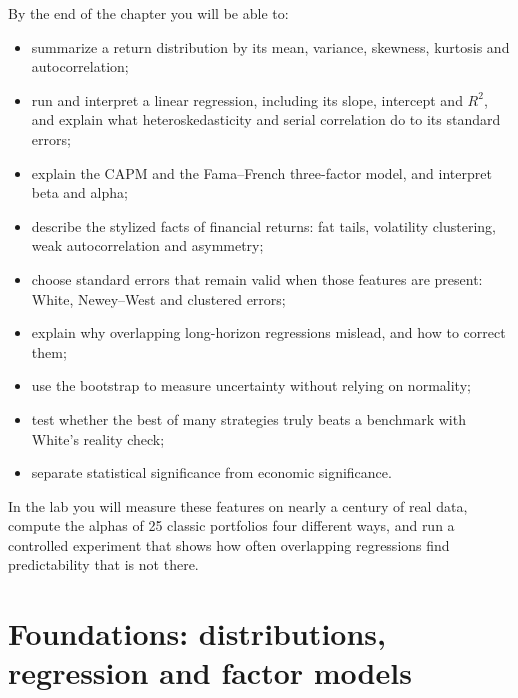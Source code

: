 By the end of the chapter you will be able to:

\begin{itemize}
  \item summarize a return distribution by its mean, variance, skewness, kurtosis and autocorrelation;
  \item run and interpret a linear regression, including its slope, intercept and $R^2$, and explain what heteroskedasticity and serial correlation do to its standard errors;
  \item explain the CAPM and the Fama--French three-factor model, and interpret beta and alpha;
  \item describe the stylized facts of financial returns: fat tails, volatility clustering, weak autocorrelation and asymmetry;
  \item choose standard errors that remain valid when those features are present: White, Newey--West and clustered errors;
  \item explain why overlapping long-horizon regressions mislead, and how to correct them;
  \item use the bootstrap to measure uncertainty without relying on normality;
  \item test whether the best of many strategies truly beats a benchmark with White's reality check;
  \item separate statistical significance from economic significance.
\end{itemize}

In the lab you will measure these features on nearly a century of real data, compute the alphas of 25 classic portfolios four different ways, and run a controlled experiment that shows how often overlapping regressions find predictability that is not there.

\section{Foundations: distributions, regression and factor models}
\label{sec:03-foundations}

